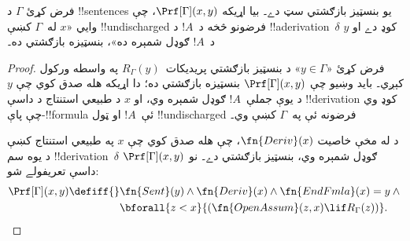 \documentclass[../../../include/open-logic-section]{subfiles}
\begin{document}
\begin{prop}
  فرض کړئ $\Gamma$ د !!{sentence}s يو بنسټيز بازګشتي سټ دے۔ بيا
  اړيکه $\Prf[\Gamma](x,y)$، چې وايي «$x$ له~$\Gamma$ کښې
  !!{undischarged} فرضونو څخه د~$!A$ د !!a{derivation}~$\delta$ کوډ
  دے او $y$ د~$!A$ ګوډل شمېره ده»، بنسټيزه بازګشتي ده۔
\end{prop}

\begin{proof}
  فرض کړئ «$y\in\Gamma$» د بنسټيز بازګشتي
  پريديکات~$R_\Gamma(y)$ په واسطه ورکول کېږي۔ بايد وښيو چې
  $\Prf[\Gamma](x,y)$ بنسټيزه بازګشتي ده؛ دا اړيکه هله صدق کوي چې
  $y$ د يوې جملې~$!A$ ګوډل شمېره وي، او $x$ د طبيعي استنتاج د داسې
  !!{derivation} کوډ وي چې پاې-!!{formula} ئې~$!A$ او ټول
  !!{undischarged} فرضونه ئې په~$\Gamma$ کښې وي۔

  د  له مخې خاصيت $\fn{Deriv}(x)$، چې هله صدق کوي
  چې $x$ په طبيعي استنتاج کښې د يوه سم !!{derivation}~$\delta$ ګوډل
  شمېره وي، بنسټيز بازګشتي دے۔ نو $\Prf[\Gamma](x,y)$ داسې تعريفولے
  شو:
  \begin{align*}
    \Prf[\Gamma](x, y) \defiff {}
    & \fn{Sent}(y) \land \fn{Deriv}(x) \land \fn{EndFmla}(x) = y \land {} \\
    & \bforall{z < x}{(\fn{OpenAssum}(z, x) \lif R_\Gamma(z))}.
  \end{align*}
\end{proof}
\end{document}
